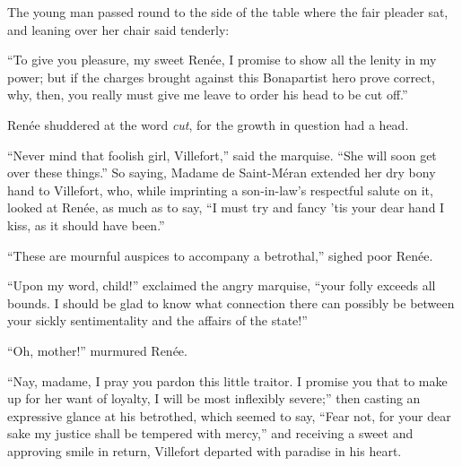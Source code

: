 The young man passed round to the side of the table where the fair
pleader sat, and leaning over her chair said tenderly:

“To give you pleasure, my sweet Renée, I promise to show all the lenity
in my power; but if the charges brought against this Bonapartist hero
prove correct, why, then, you really must give me leave to order his
head to be cut off.”

Renée shuddered at the word \textit{cut}, for the growth in question had a
head.

“Never mind that foolish girl, Villefort,” said the marquise. “She will
soon get over these things.” So saying, Madame de Saint-Méran extended
her dry bony hand to Villefort, who, while imprinting a son-in-law’s
respectful salute on it, looked at Renée, as much as to say, “I must
try and fancy ’tis your dear hand I kiss, as it should have been.”

“These are mournful auspices to accompany a betrothal,” sighed poor
Renée.

“Upon my word, child!” exclaimed the angry marquise, “your folly
exceeds all bounds. I should be glad to know what connection there can
possibly be between your sickly sentimentality and the affairs of the
state!”

“Oh, mother!” murmured Renée.

“Nay, madame, I pray you pardon this little traitor. I promise you that
to make up for her want of loyalty, I will be most inflexibly severe;”
then casting an expressive glance at his betrothed, which seemed to
say, “Fear not, for your dear sake my justice shall be tempered with
mercy,” and receiving a sweet and approving smile in return, Villefort
departed with paradise in his heart.
